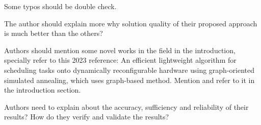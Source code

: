 \documentclass[12pt,american]{scrartcl}
\begin{document}
\begin{revcomment}
  Some typos should be double check.
\end{revcomment}
\begin{revresponse}
  
\end{revresponse}

\begin{revcomment}
  The author should explain more why solution quality of their proposed approach is much better than the others?
\end{revcomment}
\begin{revresponse}
  
\end{revresponse}

\begin{revcomment}
  Authors should mention some novel works in the field in the introduction, specially refer to this 2023 reference: An efficient lightweight algorithm for scheduling tasks onto dynamically reconfigurable hardware using graph-oriented simulated annealing, which uses graph-based method. Mention and refer to it in the introduction section.
\end{revcomment}
\begin{revresponse}
  
\end{revresponse}

\begin{revcomment}
  Authors need to explain about the accuracy, sufficiency and reliability of their results? How do they verify and validate the results?
\end{revcomment}
\begin{revresponse}
  
\end{revresponse}



\end{document}
